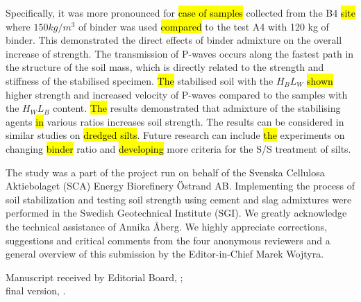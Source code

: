 \documentclass{amestyle}
\begin{document}
Specifically, it was more pronounced for \hl{case of samples} collected from the B4 \hl{site} where $150 kg/m^3$ of binder was used \hl{compared} to the test A4 with 120 kg of binder. This demonstrated the direct effects of binder admixture on the overall increase of strength. The transmission of P-waves occurs along the fastest path in the structure of the soil mass, which is directly related to the strength and stiffness of the stabilised specimen. \hl{The} stabilised soil with the $H_BL_W$ \hl{shown} higher strength and increased velocity of P-waves compared to the samples with the $H_WL_B$  content. \hl{The} results demonstrated that admixture of the stabilising agents \hl{in} various ratios increases soil strength. The results can be considered in similar studies on \hl{dredged silts}. Future research can include \hl{the} experiments on changing \hl{binder} ratio and \hl{developing} more criteria for the S/S treatment of silts.

\begin{acknowledgements}
The study was a part of the project run on behalf of the Svenska Cellulosa Aktiebolaget (SCA) Energy Biorefinery \"Ostrand AB. Implementing the process of soil stabilization and testing soil strength using cement and slag admixtures were performed in the Swedish Geotechnical Institute (SGI).
We greatly acknowledge the technical assistance of Annika Åberg. We highly appreciate corrections, suggestions and critical comments from the four anonymous reviewers and a general overview of this submission by the Editor-in-Chief Marek Wojtyra.
\end{acknowledgements}

\begin{receiptnote}
  Manuscript received by Editorial Board, \theamereceived; \\ 
  final version, \theameaccepted.
\end{receiptnote}



%
%

%
%

\end{document}
